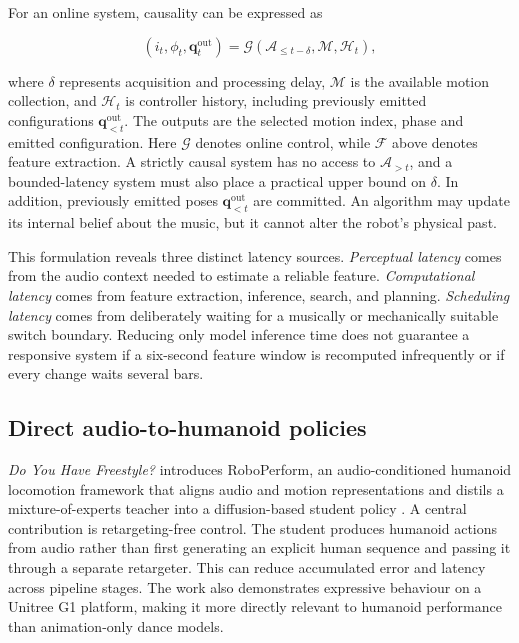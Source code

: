 For an online system, causality can be expressed as

\begin{equation}
    (i_t,\phi_t,\mathbf{q}^{\mathrm{out}}_t)
    = \mathcal{G}\!\left(\mathcal{A}_{\leq t-\delta},
                         \mathcal{M},\mathcal{H}_t\right),
\end{equation}

where $\delta$ represents acquisition and processing delay, $\mathcal{M}$ is
the available motion collection, and $\mathcal{H}_t$ is controller history,
including previously emitted configurations $\mathbf{q}^{\mathrm{out}}_{<t}$.
The outputs are the selected motion index, phase and emitted configuration.
Here $\mathcal{G}$ denotes online control, while $\mathcal{F}$ above denotes
feature extraction. A strictly causal
system has no access to $\mathcal{A}_{>t}$, and a bounded-latency system must
also place a practical upper bound on $\delta$. In addition, previously emitted
poses $\mathbf{q}^{\mathrm{out}}_{<t}$ are committed. An algorithm may update its internal
belief about the music, but it cannot alter the robot's physical past.

This formulation reveals three distinct latency sources. \emph{Perceptual
latency} comes from the audio context needed to estimate a reliable feature.
\emph{Computational latency} comes from feature extraction, inference, search,
and planning. \emph{Scheduling latency} comes from deliberately waiting for a
musically or mechanically suitable switch boundary. Reducing only model
inference time does not guarantee a responsive system if a six-second feature
window is recomputed infrequently or if every change waits several bars.

\subsection{Direct audio-to-humanoid policies}
\label{subsec:lit_freestyle}

\emph{Do You Have Freestyle?} introduces RoboPerform, an audio-conditioned
humanoid locomotion framework that aligns audio and motion representations and
distils a mixture-of-experts teacher into a diffusion-based student policy
\cite{li2026you}. A central contribution is retargeting-free control. The
student produces humanoid actions from audio rather than first generating an
explicit human sequence and passing it through a separate retargeter. This can
reduce accumulated error and latency across pipeline stages. The work also
demonstrates expressive behaviour on a Unitree G1 platform, making it more
directly relevant to humanoid performance than animation-only dance models.

